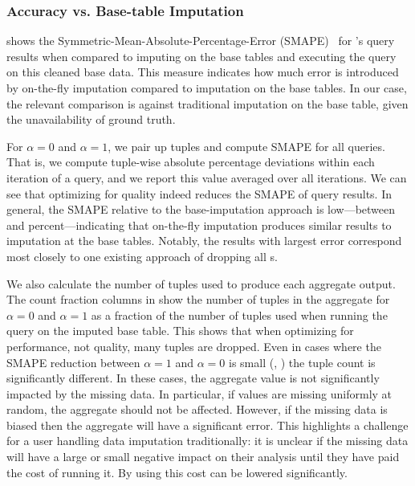 \subsubsection{Accuracy vs. Base-table Imputation}

 shows the Symmetric-Mean-Absolute-Percentage-Error
(SMAPE)~\cite{Makridakis2000451} for \ProjectName{}'s query results when compared to
imputing on the base tables and executing the query on this cleaned base data.
This measure indicates how much error is introduced by on-the-fly imputation compared to
imputation on the base tables. In our case, the relevant comparison is against traditional
imputation on the base table, given the unavailability of ground truth.

For $\alpha=0$ and $\alpha=1$, we pair up tuples and compute SMAPE for all queries. That is,
we compute tuple-wise absolute percentage deviations within each iteration of a query, and
we report this value averaged over all iterations.  We
can see that optimizing for quality indeed reduces the SMAPE of query results.  In general, the SMAPE relative 
to the base-imputation approach is low---between \lowsmapealphazero{} and
\highsmapealphaoneexacs{} percent---indicating that on-the-fly imputation produces similar
results to imputation at the base tables. Notably, the results with largest error correspond
most closely to one existing approach of dropping all \nullv{}s.

We also calculate the number of tuples used to produce each aggregate output.
The count fraction columns in  show the number of tuples in the aggregate for $\alpha = 0$ and $\alpha = 1$ as a fraction of the number of tuples
used when running the query on the imputed base table.
This shows that when optimizing for performance, not quality, many tuples are dropped.
Even in cases where the SMAPE reduction between $\alpha = 1$ and $\alpha = 0$ is small (, ) the tuple count is significantly different.
In these cases, the aggregate value is not significantly impacted by the missing data. In particular, if values are missing uniformly at random,
the aggregate should not be affected.
However, if the missing data is biased then the aggregate will have a significant error.
This highlights a challenge for a user handling data imputation traditionally: it is unclear if the missing data will have a large or small negative impact on their analysis until they have paid the cost of running it.
By using \ProjectName{} this cost can be lowered significantly.


